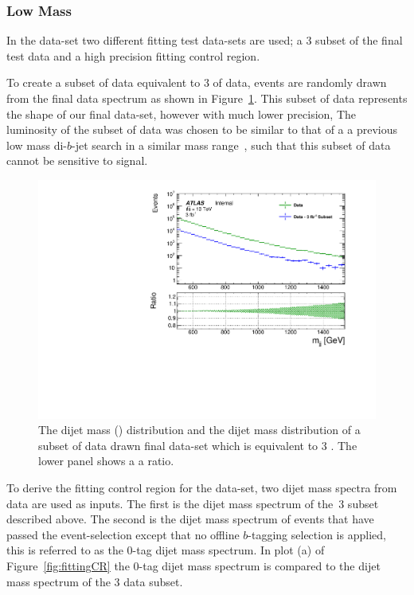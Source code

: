 \subsubsection{Low Mass}
\label{sec:lowmass_bkgsample}

In the \lm{} data-set two different fitting test data-sets are used;
a 3 \ifb{} subset of the final test data and a high precision fitting control region.

To create a subset of data equivalent to 3 \ifb{} of data,
events are randomly drawn from the final data spectrum as shown in Figure~\ref{fig:fittingDataSubset}.
This subset of data represents the shape of our final data-set, however with much lower precision,
The luminosity of the subset of data was chosen to be similar to that of a
a previous low mass di-$b$-jet search in a similar mass range~\cite{dibjet-lhcp_conf},
such that this subset of data cannot be sensitive to signal.

\begin{figure}[!htb]
\captionsetup[subfigure]{aboveskip=0pt,justification=centering}
\centering
\includegraphics[width=0.7\linewidth, angle=0]{figs/Dibjet/LowMass/FitStudy/subset_dataComp.pdf}
\vspace{10pt}
\caption{\label{fig:fittingDataSubset}
  The \lm{} dijet mass (\mjj{}) distribution and the dijet mass distribution of a subset of data drawn final data-set which is equivalent to 3 \ifb{}.
  The lower panel shows a a ratio.}
\end{figure}

To derive the fitting control region for the \lm{} data-set,
two dijet mass spectra from data are used as inputs.
The first is the dijet mass spectrum of the~3 \ifb{} subset described above.
The second is the dijet mass spectrum of events that have passed the \lm{} event-selection
except that no offline $b$-tagging selection is applied, this is referred to as the 0-tag dijet mass spectrum.
In plot (a) of Figure~\ref{fig:fittingCR} the 0-tag dijet mass spectrum is compared to the dijet mass spectrum of the 3 \ifb{} data subset.

